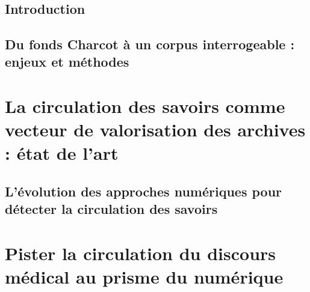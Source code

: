 \documentclass[a4paper,12pt]{book}
\begin{document}
\renewcommand{\arraystretch}{1.5}


~
\thispagestyle{empty}
\setcounter{page}{0}
\newpage



\chapter{Introduction}






\chapter{Du fonds Charcot à un corpus interrogeable : enjeux et méthodes}

%

\part{La circulation des savoirs comme vecteur de valorisation des archives : état de l'art}
\chapter{L’évolution des approches numériques pour détecter la circulation des savoirs}






\part{Pister la circulation du discours médical au prisme du numérique}

\end{document}
